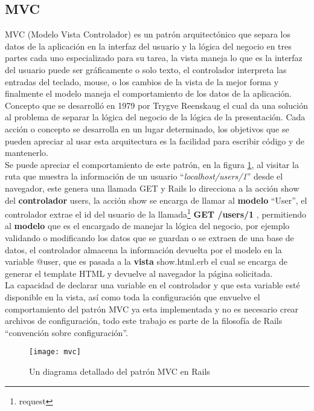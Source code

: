     \subsection{MVC} %
    \label{sub:mvc}
      MVC (Modelo Vista  Controlador) es un patrón arquitectónico que separa los datos de la aplicación en la interfaz del usuario y  la lógica del negocio en tres partes cada uno especializado para su tarea, la vista maneja lo que es la interfaz del usuario puede ser gráficamente o solo texto, el controlador interpreta las entradas del teclado, mouse, o los cambios de la vista de la mejor forma y finalmente el modelo maneja el comportamiento de los datos de la aplicación.\cite{web7}\\

      Concepto que se desarrolló en 1979 por Trygve Reenskaug el cual da una solución al problema de separar la lógica del negocio de la lógica de la presentación. Cada acción o concepto se desarrolla en un lugar determinado, los objetivos que se pueden apreciar al usar esta arquitectura es la facilidad para escribir código y de mantenerlo. \\

      Se puede apreciar el comportamiento de este patrón, en la figura \ref{fig:mvc}, al visitar la ruta que muestra la información de un usuario ``\emph{localhost/users/1}'' desde el navegador, este genera una llamada GET y Rails lo direcciona a la acción show del \textbf{controlador} users, la acción show se encarga de llamar al \textbf{modelo} “User”, el controlador extrae el id del usuario de la llamada\footnote{request} \textbf{ GET /users/1 }, permitiendo al \textbf{modelo} que es el encargado de manejar la lógica del negocio, por ejemplo validando o modificando los datos que se guardan o se extraen de una base de datos, el controlador almacena la información devuelta por el modelo en la variable @user, que es pasada a la \textbf{vista} show.html.erb el cual se encarga de generar el template HTML y devuelve al navegador la página solicitada. \\

      La capacidad de declarar una variable en el controlador y que esta variable esté disponible en la vista, así como toda la configuración que envuelve el comportamiento del patrón MVC ya esta implementada y no es necesario crear archivos de configuración, todo este trabajo es parte de la filosofía de Rails “convención sobre configuración”.\\

      \begin{figure}[!hbp]
        \begin{center}
          \texttt{[image: mvc]}
        \end{center}
        \caption{Un diagrama detallado del patr\'on MVC en Rails}
        \label{fig:mvc}
      \end{figure}

